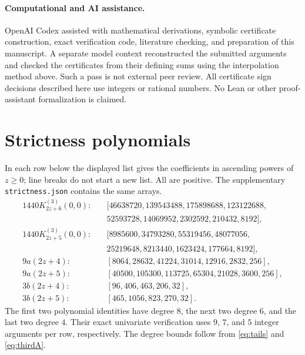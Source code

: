 \documentclass[11pt]{article}
\begin{document}
\paragraph{Computational and AI assistance.}
OpenAI Codex assisted with mathematical derivations, symbolic certificate
construction, exact verification code, literature checking, and preparation
of this manuscript. A separate model context reconstructed the submitted
arguments and checked the certificates from their defining sums using
the interpolation method above. Such a pass is not external peer review.
All certificate sign decisions described here use integers or rational
numbers. No Lean or other proof-assistant formalization is claimed.

\appendix
\section{Strictness polynomials}\label{app:strict}
In each row below the displayed list gives the coefficients in ascending
powers of $z\ge0$; line breaks do not start a new list. All are positive.
The supplementary \texttt{strictness.json} contains the same arrays.
\begin{align*}
1440K^{(3)}_{2z+6}(0,0):\quad&[46638720,139543488,175898688,123122688,\\
 &52593728,14069952,2302592,210432,8192],\\
1440K^{(3)}_{2z+5}(0,0):\quad&[8985600,34793280,55319456,48077056,\\
 &25219648,8213440,1623424,177664,8192],\\
9a(2z+4):\quad&[8064,28632,41224,31014,12916,2832,256],\\
9a(2z+5):\quad&[40500,105300,113725,65304,21028,3600,256],\\
3b(2z+4):\quad&[96,406,463,206,32],\\
3b(2z+5):\quad&[465,1056,823,270,32].
\end{align*}
The first two polynomial identities have degree $8$, the next two degree
$6$, and the last two degree $4$. Their exact univariate verification uses
$9$, $7$, and $5$ integer arguments per row, respectively. The degree
bounds follow from \eqref{eq:tails} and \eqref{eq:thirdA}.


\raggedright


\end{document}
